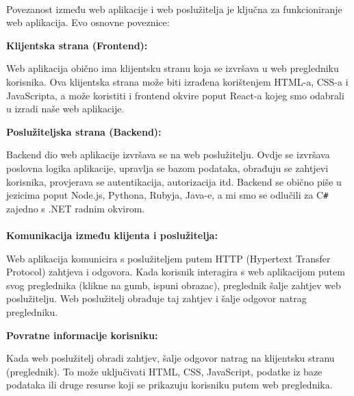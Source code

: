\paragraph{}{Povezanost između web aplikacije i web poslužitelja je ključna za funkcioniranje web aplikacija. Evo osnovne poveznice:}
\begin{packed_item}
		\item  \textbf{ Klijentska strana (Frontend):}
		\begin{packed_item}
			\item { Web aplikacija obično ima klijentsku stranu koja se izvršava u web pregledniku korisnika. Ova klijentska strana može biti izrađena korištenjem HTML-a, CSS-a i JavaScripta, a može koristiti i frontend okvire poput React-a kojeg smo odabrali u izradi naše web aplikacije.
			}
		\end{packed_item}
		\item  \textbf{Poslužiteljska strana (Backend):}
			\begin{packed_item}
			\item {Backend dio web aplikacije izvršava se na web poslužitelju. Ovdje se izvršava poslovna logika aplikacije, upravlja se bazom podataka, obrađuju se zahtjevi korisnika, provjerava se autentikacija, autorizacija itd. Backend se obično piše u jezicima poput Node.js, Pythona, Rubyja, Java-e, a mi smo se odlučili za C\verb|#| zajedno s .NET radnim okvirom.}
			\end{packed_item}
			\paragraph{}{}\paragraph{}{}
		\item  \textbf{ Komunikacija između klijenta i poslužitelja:}
		\begin{packed_item}
			\item {Web aplikacija komunicira s poslužiteljem putem HTTP (Hypertext Transfer Protocol) zahtjeva i odgovora. Kada korisnik interagira s web aplikacijom putem svog preglednika (klikne na gumb, ispuni obrazac), preglednik šalje zahtjev web poslužitelju. Web poslužitelj obrađuje taj zahtjev i šalje odgovor natrag pregledniku.
			}
		\end{packed_item}
		\item  \textbf{ Povratne informacije korisniku:
		}
		\begin{packed_item}
			\item {Kada web poslužitelj obradi zahtjev, šalje odgovor natrag na klijentsku stranu (preglednik). To može uključivati HTML, CSS, JavaScript, podatke iz baze podataka ili druge resurse koji se prikazuju korisniku putem web preglednika.
			}
		\end{packed_item}
		
\end{packed_item}
